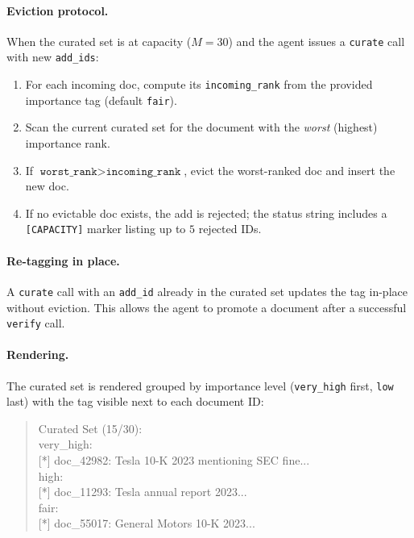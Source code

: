 \documentclass{article}
\newcommand{\verify}{\texttt{verify}\xspace}
\newcommand{\curate}{\texttt{curate}\xspace}
\begin{document}
\paragraph{Eviction protocol.}
When the curated set is at capacity ($M{=}30$) and the agent
issues a \curate call with new \texttt{add\_ids}:
\begin{enumerate}[leftmargin=1.4em,itemsep=2pt,topsep=2pt]
\item For each incoming doc, compute its
\texttt{incoming\_rank} from the provided importance tag
(default \texttt{fair}).
\item Scan the current curated set for the document with the
\emph{worst} (highest) importance rank.
\item If $\texttt{worst\_rank} > \texttt{incoming\_rank}$, evict
the worst-ranked doc and insert the new doc.
\item If no evictable doc exists, the add is rejected; the
status string includes a \texttt{[CAPACITY]} marker listing up
to $5$ rejected IDs.
\end{enumerate}

\paragraph{Re-tagging in place.}
A \curate call with an \texttt{add\_id} already in the curated
set updates the tag in-place without eviction. This allows the
agent to promote a document after a successful \verify call.

\paragraph{Rendering.}
The curated set is rendered grouped by importance level
(\texttt{very\_high} first, \texttt{low} last) with the tag
visible next to each document ID:
\begin{quote}\small\ttfamily
Curated Set (15/30):\\
\hspace*{1em}very\_high:\\
\hspace*{1em}[*] doc\_42982: Tesla 10-K 2023 mentioning SEC fine...\\
\hspace*{1em}high:\\
\hspace*{1em}[*] doc\_11293: Tesla annual report 2023...\\
\hspace*{1em}fair:\\
\hspace*{1em}[*] doc\_55017: General Motors 10-K 2023...
\end{quote}
\end{document}
